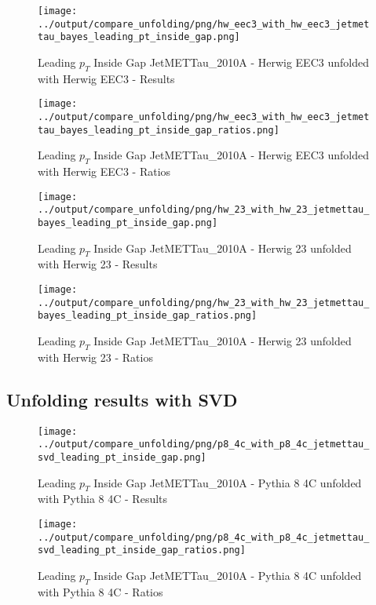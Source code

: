 \documentclass[11pt]{book}
\begin{document}
\begin{figure}[ht]
\centering
\texttt{[image: ../output/compare\_unfolding/png/hw\_eec3\_with\_hw\_eec3\_jetmettau\_bayes\_leading\_pt\_inside\_gap.png]}
\caption{Leading $p_{T}$ Inside Gap JetMETTau\_2010A - Herwig EEC3 unfolded with Herwig EEC3 - Results}
\label{hw_eec3_hw_eec3_jetmettau_bayes_leading_pt_inside_gap_a}
\end{figure}

\begin{figure}[ht]
\centering
\texttt{[image: ../output/compare\_unfolding/png/hw\_eec3\_with\_hw\_eec3\_jetmettau\_bayes\_leading\_pt\_inside\_gap\_ratios.png]}
\caption{Leading $p_{T}$ Inside Gap JetMETTau\_2010A - Herwig EEC3 unfolded with Herwig EEC3 - Ratios}
\label{hw_eec3_hw_eec3_jetmettau_bayes_leading_pt_inside_gap_b}
\end{figure}

\begin{figure}[ht]
\centering
\texttt{[image: ../output/compare\_unfolding/png/hw\_23\_with\_hw\_23\_jetmettau\_bayes\_leading\_pt\_inside\_gap.png]}
\caption{Leading $p_{T}$ Inside Gap JetMETTau\_2010A - Herwig 23 unfolded with Herwig 23 - Results}
\label{hw_23_hw_23_jetmettau_bayes_leading_pt_inside_gap_a}
\end{figure}

\begin{figure}[ht]
\centering
\texttt{[image: ../output/compare\_unfolding/png/hw\_23\_with\_hw\_23\_jetmettau\_bayes\_leading\_pt\_inside\_gap\_ratios.png]}
\caption{Leading $p_{T}$ Inside Gap JetMETTau\_2010A - Herwig 23 unfolded with Herwig 23 - Ratios}
\label{hw_23_hw_23_jetmettau_bayes_leading_pt_inside_gap_b}
\end{figure}

\clearpage
\subsection{Unfolding results with SVD}

\begin{figure}[ht]
\centering
\texttt{[image: ../output/compare\_unfolding/png/p8\_4c\_with\_p8\_4c\_jetmettau\_svd\_leading\_pt\_inside\_gap.png]}
\caption{Leading $p_{T}$ Inside Gap JetMETTau\_2010A - Pythia 8 4C unfolded with Pythia 8 4C - Results}
\label{p8_p8_jetmettau_svd_leading_pt_inside_gap_a}
\end{figure}

\begin{figure}[ht]
\centering
\texttt{[image: ../output/compare\_unfolding/png/p8\_4c\_with\_p8\_4c\_jetmettau\_svd\_leading\_pt\_inside\_gap\_ratios.png]}
\caption{Leading $p_{T}$ Inside Gap JetMETTau\_2010A - Pythia 8 4C unfolded with Pythia 8 4C - Ratios}
\label{p8_p8_jetmettau_svd_leading_pt_inside_gap_b}
\end{figure}
\end{document}
